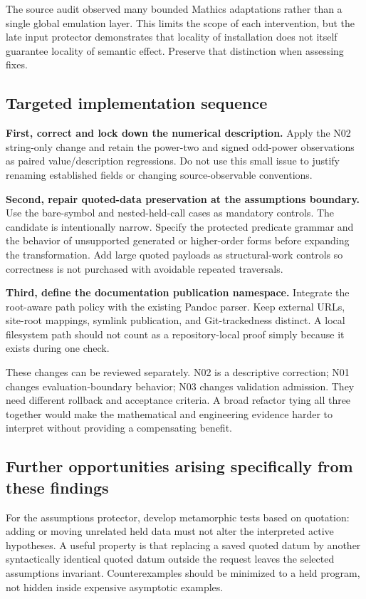 \documentclass[11pt,letterpaper]{article}
\begin{document}
The source audit observed many bounded Mathics adaptations rather than a
single global emulation layer. This limits the scope of each intervention,
but the late input protector demonstrates that locality of installation does
not itself guarantee locality of semantic effect. Preserve that distinction
when assessing fixes.\cite{main,protect}

\subsection{Targeted implementation sequence}

\textbf{First, correct and lock down the numerical description.} Apply the N02
string-only change and retain the power-two and signed odd-power observations
as paired value/description regressions. Do not use this small issue to justify
renaming established fields or changing source-observable conventions.

\textbf{Second, repair quoted-data preservation at the assumptions boundary.}
Use the bare-symbol and nested-held-call cases as mandatory controls. The
candidate is intentionally narrow. Specify the protected predicate grammar
and the behavior of unsupported generated or higher-order forms before
expanding the transformation. Add large quoted payloads as structural-work
controls so correctness is not purchased with avoidable repeated traversals.

\textbf{Third, define the documentation publication namespace.} Integrate the
root-aware path policy with the existing Pandoc parser. Keep external URLs,
site-root mappings, symlink publication, and Git-trackedness distinct. A local
filesystem path should not count as a repository-local proof simply because
it exists during one check.

These changes can be reviewed separately. N02 is a descriptive correction;
N01 changes evaluation-boundary behavior; N03 changes validation admission.
They need different rollback and acceptance criteria. A broad refactor tying
all three together would make the mathematical and engineering evidence harder
to interpret without providing a compensating benefit.

\subsection{Further opportunities arising specifically from these findings}

For the assumptions protector, develop metamorphic tests based on quotation:
adding or moving unrelated held data must not alter the interpreted active
hypotheses. A useful property is that replacing a saved quoted datum by another
syntactically identical quoted datum outside the request leaves the selected
assumptions invariant. Counterexamples should be minimized to a held program,
not hidden inside expensive asymptotic examples.
\end{document}

